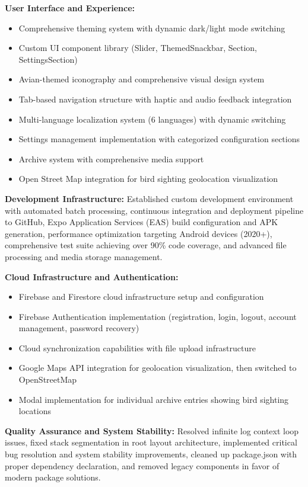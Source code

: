 \textbf{User Interface and Experience:}
\begin{itemize}
    \item Comprehensive theming system with dynamic dark/light mode switching
    \item Custom UI component library (Slider, ThemedSnackbar, Section, SettingsSection)
    \item Avian-themed iconography and comprehensive visual design system
    \item Tab-based navigation structure with haptic and audio feedback integration
    \item Multi-language localization system (6 languages) with dynamic switching
    \item Settings management implementation with categorized configuration sections
    \item Archive system with comprehensive media support
    \item Open Street Map integration for bird sighting geolocation visualization
\end{itemize}

\textbf{Development Infrastructure:} Established custom development environment with automated batch processing, continuous integration and deployment pipeline to GitHub, Expo Application Services (EAS) build configuration and APK generation, performance optimization targeting Android devices (2020+), comprehensive test suite achieving over 90\% code coverage, and advanced file processing and media storage management.

\textbf{Cloud Infrastructure and Authentication:}
\begin{itemize}
    \item Firebase and Firestore cloud infrastructure setup and configuration
    \item Firebase Authentication implementation (registration, login, logout, account management, password recovery)
    \item Cloud synchronization capabilities with file upload infrastructure
    \item Google Maps API integration for geolocation visualization, then switched to OpenStreetMap
    \item Modal implementation for individual archive entries showing bird sighting locations
\end{itemize}

\textbf{Quality Assurance and System Stability:} Resolved infinite log context loop issues, fixed stack segmentation in root layout architecture, implemented critical bug resolution and system stability improvements, cleaned up package.json with proper dependency declaration, and removed legacy components in favor of modern package solutions.

